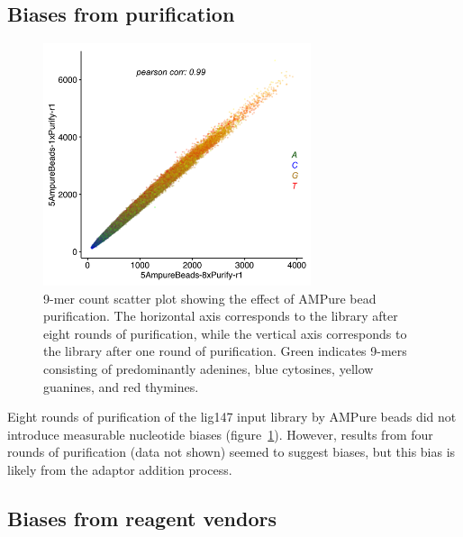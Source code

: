 \documentclass[parskip=full, numbers=noenddot]{scrreprt}
\begin{document}
\subsection{Biases from purification}
\label{ssec:pcrbias_result_pur}

\begin{figure}[htpb]
  \centering
  \includegraphics[width=0.7\textwidth]{kmer_ampure}
  \caption{9-mer count scatter plot showing the effect of AMPure bead purification.  The horizontal axis corresponds to the library after eight rounds of purification, while the vertical axis corresponds to the library after one round of purification.  Green indicates 9-mers consisting of predominantly adenines, blue cytosines, yellow guanines, and red thymines.}
  \label{fig:kmer_pur}
\end{figure}

Eight rounds of purification of the lig147 input library by AMPure beads did not introduce measurable nucleotide biases (figure~\ref{fig:kmer_pur}).  However, results from four rounds of purification (data not shown) seemed to suggest biases, but this bias is likely from the adaptor addition process. %

\subsection{Biases from reagent vendors}
\label{ssec:pcrbias_result_reagent}
\end{document}
